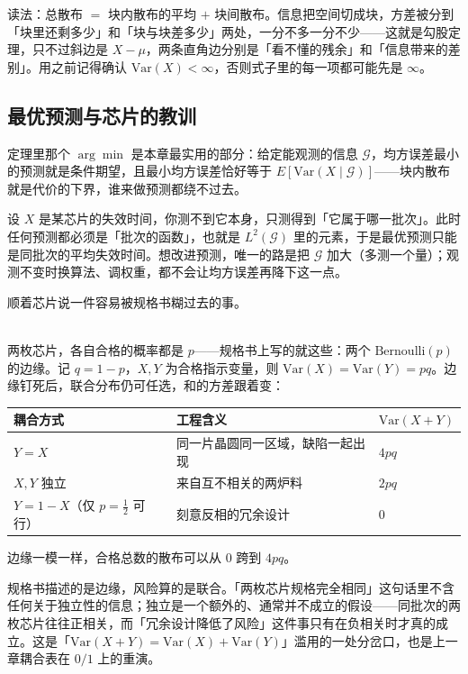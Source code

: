 读法：总散布 $=$ 块内散布的平均 $+$ 块间散布。信息把空间切成块，方差被分到「块里还剩多少」和「块与块差多少」两处，一分不多一分不少——这就是勾股定理，只不过斜边是 $X-\mu$，两条直角边分别是「看不懂的残余」和「信息带来的差别」。用之前记得确认 $\mathrm{Var}(X)<\infty$，否则式子里的每一项都可能先是 $\infty$。

\subsection{最优预测与芯片的教训}

定理里那个 $\arg\min$ 是本章最实用的部分：给定能观测的信息 $\mathcal{G}$，均方误差最小的预测就是条件期望，且最小均方误差恰好等于 $E[\mathrm{Var}(X\mid\mathcal{G})]$——块内散布就是代价的下界，谁来做预测都绕不过去。

\begin{example}[只能看见粗粒度时]
设 $X$ 是某芯片的失效时间，你测不到它本身，只测得到「它属于哪一批次」。此时任何预测都必须是「批次的函数」，也就是 $L^2(\mathcal{G})$ 里的元素，于是最优预测只能是同批次的平均失效时间。想改进预测，唯一的路是把 $\mathcal{G}$ 加大（多测一个量）；观测不变时换算法、调权重，都不会让均方误差再降下这一点。
\end{example}

顺着芯片说一件容易被规格书糊过去的事。

\begin{example}[边际相同绝不等于独立]\ \\
两枚芯片，各自合格的概率都是 $p$——规格书上写的就这些：两个 $\mathrm{Bernoulli}(p)$ 的边缘。记 $q=1-p$，$X,Y$ 为合格指示变量，则 $\mathrm{Var}(X)=\mathrm{Var}(Y)=pq$。边缘钉死后，联合分布仍可任选，和的方差跟着变：
\begin{center}
\begin{tabular}{lll}
\hline
耦合方式 & 工程含义 & $\mathrm{Var}(X+Y)$\\
\hline
$Y=X$ & 同一片晶圆同一区域，缺陷一起出现 & $4pq$\\
$X,Y$ 独立 & 来自互不相关的两炉料 & $2pq$\\
$Y=1-X$（仅 $p=\frac12$ 可行） & 刻意反相的冗余设计 & $0$\\
\hline
\end{tabular}
\end{center}
边缘一模一样，合格总数的散布可以从 $0$ 跨到 $4pq$。
\end{example}

\begin{remark}
规格书描述的是边缘，风险算的是联合。「两枚芯片规格完全相同」这句话里不含任何关于独立性的信息；独立是一个额外的、通常并不成立的假设——同批次的两枚芯片往往正相关，而「冗余设计降低了风险」这件事只有在负相关时才真的成立。这是「$\mathrm{Var}(X+Y)=\mathrm{Var}(X)+\mathrm{Var}(Y)$」滥用的一处分岔口，也是上一章耦合表在 $0/1$ 上的重演。
\end{remark}

